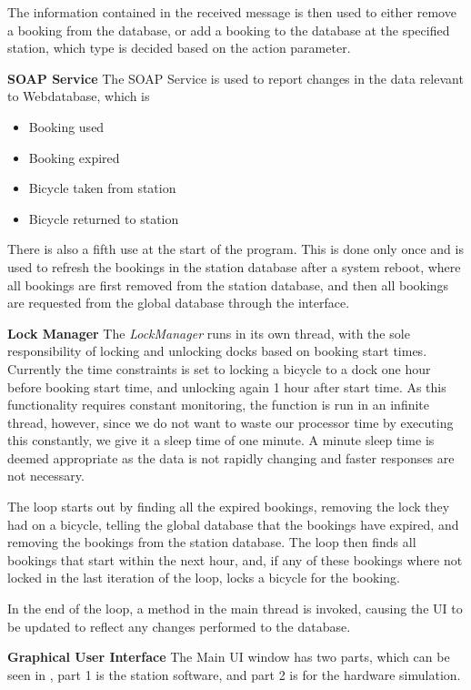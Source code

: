The information contained in the received message is then used to either remove a booking from the database, or add a booking to the database at the specified station, which type is decided based on the action parameter.

\textbf{SOAP Service}
The SOAP Service is used to report changes in the data relevant to Webdatabase, which is
\begin{itemize}
\item Booking used
\item Booking expired
\item Bicycle taken from station
\item Bicycle returned to station
\end{itemize}
There is also a fifth use at the start of the program. This is done only once and is used to refresh the bookings in the station database after a system reboot, where all bookings are first removed from the station database, and then all bookings are requested from the global database through the interface.

\textbf{Lock Manager}
The \textit{LockManager} runs in its own thread, with the sole responsibility of locking and unlocking docks based on booking start times. Currently the time constraints is set to locking a bicycle to a dock one hour before booking start time, and unlocking again 1 hour after start time. As this functionality requires constant monitoring, the function is run in an infinite thread, however, since we do not want to waste our processor time by executing this constantly, we give it a sleep time of one minute. A minute sleep time is deemed appropriate as the data is not rapidly changing and faster responses are not necessary.

The loop starts out by finding all the expired bookings, removing the lock they had on a bicycle, telling the global database that the bookings have expired, and removing the bookings from the station database.
The loop then finds all bookings that start within the next hour, and, if any of these bookings where not locked in the last iteration of the loop, locks a bicycle for the booking.

In the end of the loop, a method in the main thread is invoked, causing the UI to be updated to reflect any changes performed to the database.


\textbf{Graphical User Interface}
The Main UI window has two parts, which can be seen in , part 1 is the station software, and part 2 is for the hardware simulation.

